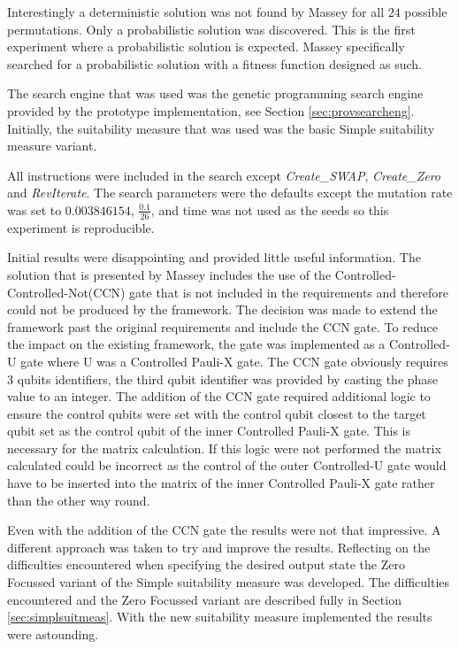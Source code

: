 Interestingly a deterministic solution was not found by Massey for all $24$ possible permutations.
Only a probabilistic solution was discovered.
This is the first experiment where a probabilistic solution is expected.
Massey specifically searched for a probabilistic solution with a fitness function designed as such.

The search engine that was used was the genetic programming search engine provided by the prototype implementation, see Section \ref{sec:provsearcheng}.
Initially, the suitability measure that was used was the basic Simple suitability measure variant.

All instructions were included in the search except \emph{Create\_SWAP}, \emph{Create\_Zero} and \emph{RevIterate}.
The search parameters were the defaults except the mutation rate was set to $0.003846154$, $\frac{0.1}{26}$, and time was not used as the seeds so this experiment is reproducible.

Initial results were disappointing and provided little useful information.
The solution that is presented by Massey includes the use of the Controlled-Controlled-Not(CCN) gate that is not included in the requirements and therefore could not be produced by the framework.
The decision was made to extend the framework past the original requirements and include the CCN gate.
To reduce the impact on the existing framework, the gate was implemented as a Controlled-U gate where U was a Controlled Pauli-X gate.
The CCN gate obviously requires 3 qubits identifiers, the third qubit identifier was provided by casting the phase value to an integer.
The addition of the CCN gate required additional logic to ensure the control qubits were set with the control qubit closest to the target qubit set as the control qubit of the inner Controlled Pauli-X gate.
This is necessary for the matrix calculation.
If this logic were not performed the matrix calculated could be incorrect as the control of the outer Controlled-U gate would have to be inserted into the matrix of the inner Controlled Pauli-X gate rather than the other way round.

Even with the addition of the CCN gate the results were not that impressive.
A different approach was taken to try and improve the results.
Reflecting on the difficulties encountered when specifying the desired output state the Zero Focussed variant of the Simple suitability measure was developed.
The difficulties encountered and the Zero Focussed variant are described fully in Section \ref{sec:simplsuitmeas}.
With the new suitability measure implemented the results were astounding.

